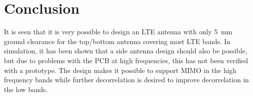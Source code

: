 \section{Conclusion}
\label{sec:conclusion}
It is seen that it is very possible to design an LTE antenna with only \SI{5}{mm} ground clearance for the top/bottom antenna covering most LTE bands. In simulation, it has been shown that a side antenna design should also be possible, but due to problems with the PCB at high frequencies, this has not been verified with a prototype. The design makes it possible to support MIMO in the high frequency bands while further decorrelation is desired to improve decorrelation in the low bands.

% 
% 
% 
% 
